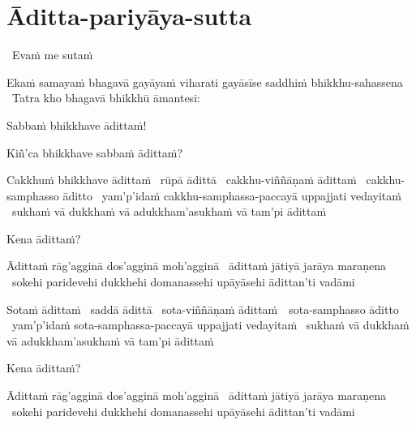 
\section{Āditta-pariyāya-sutta}
\label{aditta-pariyaya}

\begin{leader}
  \anglebracketleft\ \hspace{-0.5mm}Evaṁ me sutaṁ \hspace{-0.5mm}\anglebracketright\
\end{leader}

\begin{pali-hang}
  Ekaṁ samayaṁ bhagavā gayāyaṁ viharati gayāsīse saddhiṁ bhikkhu-sahassena \breathmark\ Tatra kho bhagavā bhikkhū āmantesi:
\end{pali-hang}

Sabbaṁ bhikkhave ādittaṁ!

Kiñ'ca bhikkhave sabbaṁ ādittaṁ?

\begin{pali-hang}
  Cakkhuṁ bhikkhave ādittaṁ \breathmark\ rūpā ādittā \breathmark\ cakkhu-viññāṇaṁ ādittaṁ \breathmark\ cakkhu-samphasso āditto \breathmark\ yam'p'idaṁ cakkhu-samphassa-paccayā uppajjati vedayitaṁ \breathmark\ sukhaṁ vā dukkhaṁ vā adukkham'asukhaṁ vā tam'pi ādittaṁ
\end{pali-hang}
\begin{pali-hang-together}
  Kena ādittaṁ?
\end{pali-hang-together}
\begin{pali-hang-together}
  Ādittaṁ rāg'agginā dos'agginā moh'agginā \breathmark\ ādittaṁ jātiyā jarāya maraṇena \breathmark\ sokehi paridevehi dukkhehi domanassehi upāyāsehi ādittan'ti vadāmi
\end{pali-hang-together}

\begin{pali-hang}
  Sotaṁ ādittaṁ \breathmark\ saddā ādittā \breathmark\ sota-viññāṇaṁ \mbox{ādittaṁ}~\breathmark\ sota-samphasso āditto \breathmark\ yam'p'idaṁ sota-samphassa-paccayā uppajjati vedayitaṁ \breathmark\ sukhaṁ vā dukkhaṁ vā adukkham'asukhaṁ vā tam'pi ādittaṁ
\end{pali-hang}
\ifninebythirteen\clearpage\fi
\begin{pali-hang-together}
  Kena ādittaṁ?
\end{pali-hang-together}
\begin{pali-hang-together}
  Ādittaṁ rāg'agginā dos'agginā moh'agginā \breathmark\ ādittaṁ jātiyā jarāya maraṇena \breathmark\ sokehi paridevehi dukkhehi domanassehi upāyāsehi ādittan'ti vadāmi
\end{pali-hang-together}

